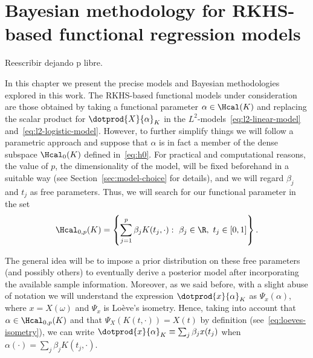 %
%

\let\epsilon\varepsilon

\chapter{Bayesian methodology for RKHS-based functional regression models}\label{ch:bayesian}

\begin{outcomment}
  Reescribir dejando p libre.
\end{outcomment}

In this chapter we present the precise models and Bayesian methodologies explored in this work. The RKHS-based functional models under consideration \citep[see][]{berrendero2018functional, berrendero2019rkhs} are those obtained by taking a functional parameter \(\alpha \in \Hcal(K)\) and replacing the scalar product for \(\dotprod{X}{\alpha}_K\) in the \(L^2\)-models~\eqref{eq:l2-linear-model} and~\eqref{eq:l2-logistic-model}. However, to further simplify things we will follow a parametric approach and suppose that \(\alpha\) is in fact a member of the dense subspace \(\Hcal_0(K)\) defined in~\eqref{eq:h0}. For practical and computational reasons, the value of \(p\), the dimensionality of the model, will be fixed beforehand in a suitable way (see Section~\ref{sec:model-choice} for details), and we will regard \(\beta_j\) and \(t_j\) as free parameters. Thus, we will search for our functional parameter in the set
\begin{equation}\label{eq:h0p}
\Hcal_{0,p}(K)=\left\{ \sum_{j=1}^p \beta_j K(t_j, \cdot): \ \beta_j \in \R, \ t_j \in [0, 1]\right\}.
\end{equation}

The general idea will be to impose a prior distribution on these free parameters (and possibly others) to eventually derive a posterior model after incorporating the available sample information.  Moreover, as we said before, with a slight abuse of notation we will understand the expression \(\dotprod{x}{\alpha}_K\) as \(\Psi_x(\alpha)\), where \(x=X(\omega)\) and \(\Psi_x\) is Loève's isometry. Hence, taking into account that \(\alpha \in \Hcal_{0,p}(K)\) and that \(\Psi_X(K(t, \cdot)) = X(t)\) by definition (see~\eqref{eq:loeves-isometry}), we can write \(\dotprod{x}{\alpha}_K \equiv \sum_j \beta_j x(t_j)\) when \(\alpha(\cdot)=\sum_j\beta_j K(t_j, \cdot)\).

